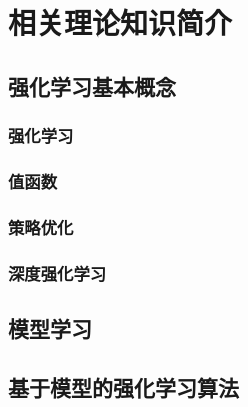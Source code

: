 
\chapter{相关理论知识简介}

\section{强化学习基本概念}

\subsection{强化学习}

\subsection{值函数}

\subsection{策略优化}

\subsection{深度强化学习}

\section{模型学习}

\section{基于模型的强化学习算法}